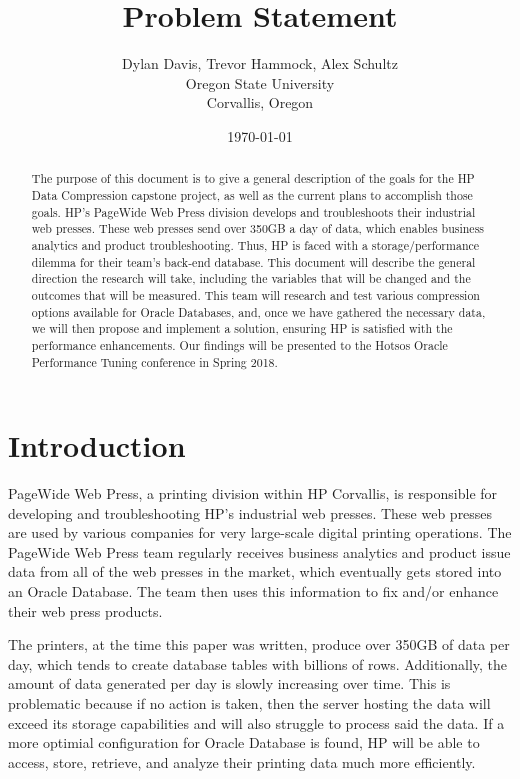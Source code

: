 \documentclass{article}
\title{Problem Statement}
\author{
		Dylan Davis, Trevor Hammock, Alex Schultz \\
        Oregon State University\\
        Corvallis, Oregon
}
\date{\today}
\begin{document}
\begin{titlingpage}
\maketitle

\begin{abstract}
The purpose of this document is to give a general description of the goals for the HP Data Compression capstone project, as well as the current plans to accomplish those goals. HP's PageWide Web Press division develops and troubleshoots their industrial web presses. These web presses send over 350GB a day of data, which enables business analytics and product troubleshooting. Thus, HP is faced with a storage/performance dilemma for their team's back-end database. This document will describe the general direction the research will take, including the variables that will be changed and the outcomes that will be measured. This team will research and test various compression options available for Oracle Databases, and, once we have gathered the necessary data, we will then propose and implement a solution, ensuring HP is satisfied with the performance enhancements. Our findings will be presented to the Hotsos Oracle Performance Tuning conference in Spring 2018.
\end{abstract}
\end{titlingpage}

\section{Introduction}
PageWide Web Press, a printing division within HP Corvallis, is responsible for developing and troubleshooting HP's industrial web presses. These web presses are used by various companies for very large-scale digital printing operations. The PageWide Web Press team regularly receives business analytics and product issue data from all of the web presses in the market, which eventually gets stored into an Oracle Database. The team then uses this information to fix and/or enhance their web press products.

The printers, at the time this paper was written, produce over 350GB of data per day, which tends to create database tables with billions of rows. Additionally, the amount of data generated per day is slowly increasing over time. This is problematic because if no action is taken, then the server hosting the data will exceed its storage capabilities and will also struggle to process said the data. If a more optimial configuration for Oracle Database is found, HP will be able to access, store, retrieve, and analyze their printing data much more efficiently.
\end{document}
